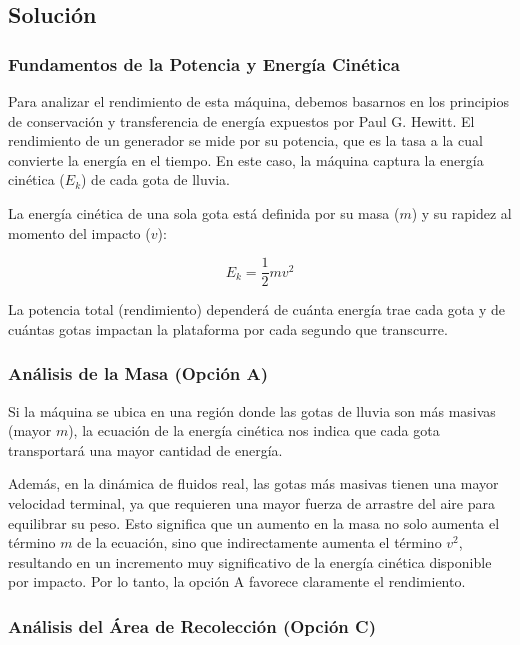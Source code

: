 \documentclass[12pt, a4paper]{article}
\begin{document}
\subsection*{Solución}

\subsubsection*{Fundamentos de la Potencia y Energía Cinética}

Para analizar el rendimiento de esta máquina, debemos basarnos en los principios de conservación y transferencia de energía expuestos por Paul G. Hewitt. El rendimiento de un generador se mide por su potencia, que es la tasa a la cual convierte la energía en el tiempo. En este caso, la máquina captura la energía cinética ($E_k$) de cada gota de lluvia. 

La energía cinética de una sola gota está definida por su masa ($m$) y su rapidez al momento del impacto ($v$):

\begin{equation}
E_k = \frac{1}{2}mv^2
\end{equation}

La potencia total (rendimiento) dependerá de cuánta energía trae cada gota y de cuántas gotas impactan la plataforma por cada segundo que transcurre.

\subsubsection*{Análisis de la Masa (Opción A)}

Si la máquina se ubica en una región donde las gotas de lluvia son más masivas (mayor $m$), la ecuación de la energía cinética nos indica que cada gota transportará una mayor cantidad de energía. 

Además, en la dinámica de fluidos real, las gotas más masivas tienen una mayor velocidad terminal, ya que requieren una mayor fuerza de arrastre del aire para equilibrar su peso. Esto significa que un aumento en la masa no solo aumenta el término $m$ de la ecuación, sino que indirectamente aumenta el término $v^2$, resultando en un incremento muy significativo de la energía cinética disponible por impacto. Por lo tanto, la opción A favorece claramente el rendimiento.

\subsubsection*{Análisis del Área de Recolección (Opción C)}
\end{document}
